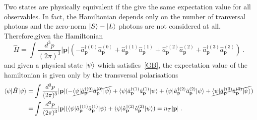     Two states are physically equivalent if the give the same expectation value for all observables. In fact, the Hamiltonian depends only on the number of tranversal photons and the zero-norm $\vert S\rangle - \vert L\rangle$ photons are not considered at all. Therefore,given the Hamiltonian
    \begin{equation*}
        \hat H = \int \frac{d^3 p}{(2\pi)^3} |\mathbf p| ( - \hat a_{\mathbf p}^{\dagger (0)} \hat a_{\mathbf p}^{(0)} + \hat a_{\mathbf p}^{\dagger (1)} \hat a_{\mathbf p}^{(1)} + \hat a_{\mathbf p}^{\dagger (2)} \hat a_{\mathbf p}^{(2)} + \hat a_{\mathbf p}^{\dagger (3)} \hat a_{\mathbf p}^{(3)})  ~.
    \end{equation*}
    and given a physical state $\vert\psi\rangle$ which satisfies~\eqref{GB}, the expectation value of the hamiltonian is given only by the transversal polarisations
    \begin{equation*}
    \begin{aligned}
        \langle\psi\vert \hat H \vert\psi\rangle & = \int \frac{d^3 p}{(2\pi)^3} |\mathbf p| ( - \cancel{\langle\psi\vert \hat a_{\mathbf p}^{\dagger (0)} \hat a_{\mathbf p}^{(0)} \vert\psi\rangle} + \langle\psi\vert \hat a_{\mathbf p}^{\dagger (1)} \hat a_{\mathbf p}^{(1)} \vert\psi\rangle + \langle\psi\vert \hat a_{\mathbf p}^{\dagger (2)} \hat a_{\mathbf p}^{(2)} \vert\psi\rangle + \cancel{\langle\psi\vert \hat a_{\mathbf p}^{\dagger (3)} \hat a_{\mathbf p}^{(3)} \vert\psi\rangle} ) \\ & = \int \frac{d^3 p}{(2\pi)^3} |\mathbf p| ( \langle\psi\vert \hat a_{\mathbf p}^{\dagger (1)} \hat a_{\mathbf p}^{(1)} \vert\psi\rangle + \langle\psi\vert \hat a_{\mathbf p}^{\dagger (2)} \hat a_{\mathbf p}^{(2)} \vert\psi\rangle ) = n_T |\mathbf p| ~.
    \end{aligned}
    \end{equation*}
